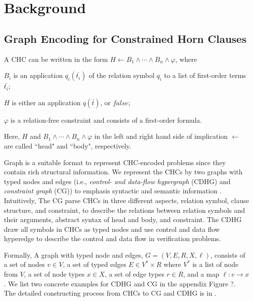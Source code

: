 
% 


\section{Background}


\subsection{Graph Encoding for Constrained Horn Clauses}

A CHC can be written in the form
$H \leftarrow B_{1}  \wedge \cdots \wedge B_{n} \wedge \varphi$,
where
\begin{inparaenum}[(i)]
  \item $B_{i}$ is an application $q_{i}(\bar{t_{i}})$ of the relation symbol $q_{i}$ to a list of first-order terms $\bar{t_{i}}$;
  \item $H$ is either an application $q(\bar{t})$, or $\mathit{false}$;
  \item $\varphi$ is a relation-free constraint and consists of a first-order formula.
\end{inparaenum}
Here, $H$ and $B_{1} \wedge \cdots \wedge B_{n} \wedge \varphi$ in the left and right hand side of implication $\leftarrow$ are called ``head" and ``body", respectively.

Graph is a suitable format to represent CHC-encoded problems since they contain rich structural information.
We represent the CHCs by two graphs with typed nodes and edges (i.e., \emph{control- and data-flow hypergraph} (CDHG) and \emph{constraint graph} (CG)) to emphasis syntactic and semantic information \cite{HornGraph}.  Intuitively, The CG parse CHCs in three different aspects, relation symbol, clause structure, and constraint, to describe the relations between relation symbols and their arguments, abstract syntax of head and body, and constraint. The CDHG draw all symbols in CHCs as typed nodes and use control and data flow hyperedge to describe the control and data flow in verification problems. 

Formally, A graph with typed node and edges, $G=(V,\mathit{E},R,X,\ell)$, consists of a set of nodes $v\in V$, a set of typed edges $\mathit{E} \in V^{*} \times R$ where $V^{*}$ is a list of node from $V$, a set of node types $x\in X$, a set of edge types $r\in R$, and a map $\ell: v\rightarrow x$. We list two concrete examples for CDHG and CG in the appendix Figure ?. The detailed constructing process from CHCs to CG and CDHG is in \cite{HornGraph}.


